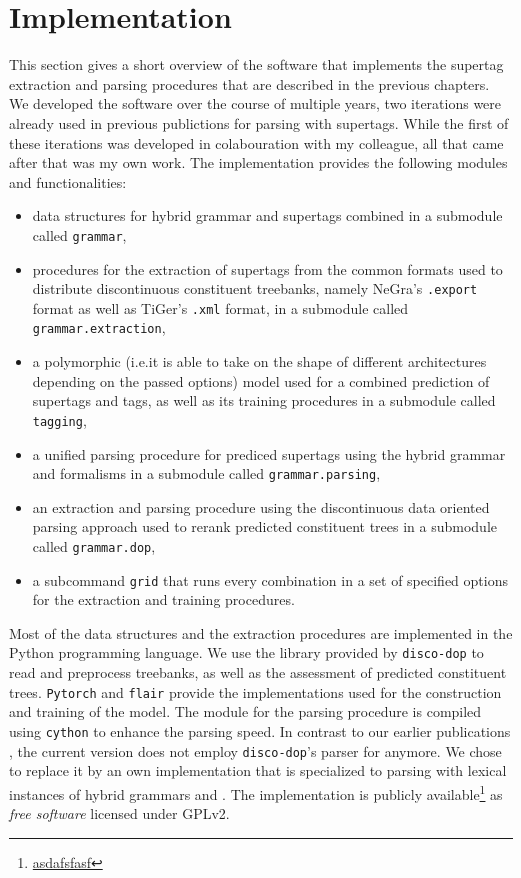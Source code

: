 \documentclass[../../document.tex]{subfiles}
\begin{document}
    \section{Implementation}
    This section gives a short overview of the software that implements the supertag extraction and parsing procedures that are described in the previous chapters.
    We developed the software over the course of multiple years, two iterations were already used in previous publictions for parsing with  supertags. \citep{RupMoe21,Rup22}
    While the first of these iterations was developed in colabouration with my colleague, all that came after that was my own work.
    The implementation provides the following modules and functionalities:
    \begin{itemize}
        \item data structures for hybrid grammar and  supertags combined in a submodule called \texttt{grammar},
        \item procedures for the extraction of supertags from the common formats used to distribute discontinuous constituent treebanks, namely NeGra's \texttt{.export} format as well as TiGer's \texttt{.xml} format, in a submodule called \texttt{grammar.extraction},
        \item a polymorphic (i.e.\@ it is able to take on the shape of different architectures depending on the passed options)  model used for a combined prediction of supertags and  tags, as well as its training procedures in a submodule called \texttt{tagging}, 
        \item a unified parsing procedure for prediced supertags using the hybrid grammar and  formalisms in a submodule called \texttt{grammar.parsing},
        \item an extraction and parsing procedure using the discontinuous data oriented parsing approach used to rerank predicted constituent trees in a submodule called \texttt{grammar.dop},
        \item a subcommand \texttt{grid} that runs every combination in a set of specified options for the extraction and training procedures.
    \end{itemize}
    
    Most of the data structures and the extraction procedures are implemented in the Python programming language.
    We use the library provided by \texttt{disco-dop} \citep{Cra12} to read and preprocess treebanks, as well as the assessment of predicted constituent trees.
    \texttt{Pytorch} \citep{} and \texttt{flair} \citep{} provide the implementations used for the construction and training of the  model.
    The module for the parsing procedure is compiled using \texttt{cython} \citep{} to enhance the parsing speed.
    In contrast to our earlier publications \citet{RupMoe21,Rup22}, the current version does not employ \texttt{disco-dop}'s parser for  anymore.
    We chose to replace it by an own implementation that is specialized to parsing with lexical instances of hybrid grammars and .
    The implementation is publicly available\footnote{\url{asdafsfasf}} as \emph{free software} licensed under GPLv2.
\end{document}
